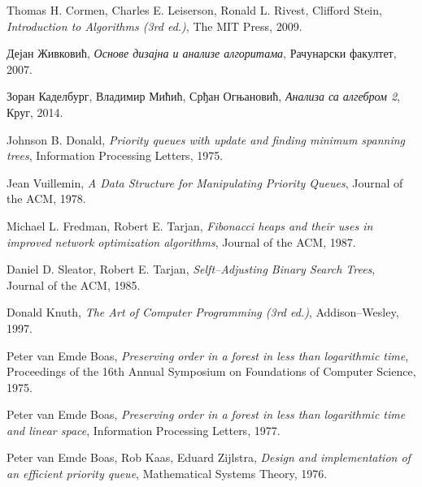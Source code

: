\documentclass[11pt, a4paper]{article}
\theoremstyle{remark}
\numberwithin{equation}{section}
\begin{document}
	\renewcommand\refname{Литература}
	\begin{thebibliography}{9}
		Thomas H. Cormen, Charles E. Leiserson, Ronald L. Rivest, Clifford Stein,
		\textit{Introduction to Algorithms (3rd ed.)},
		The MIT Press, 2009.
		
		Дејан Живковић,
		\textit{Основе дизајна и анализе алгоритама},
		Рачунарски факултет, 2007.
		
		Зоран Каделбург, Владимир Мићић, Срђан Огњановић,
		\textit{Анализа са алгебром 2},
		Круг, 2014.
		
		Johnson B. Donald,
		\textit{Priority queues with update and finding minimum spanning trees},
		Information Processing Letters, 1975.
		
		Jean Vuillemin,
		\textit{A Data Structure for Manipulating Priority Queues},
		Journal of the ACM, 1978.
		
		Michael L. Fredman, Robert E. Tarjan,
		\textit{Fibonacci heaps and their uses in improved network optimization algorithms},
		Journal of the ACM, 1987.
		
		Daniel D. Sleator, Robert E. Tarjan,
		\textit{Selft--Adjusting Binary Search Trees},
		Journal of the ACM, 1985.
		
		Donald Knuth,
		\textit{The Art of Computer Programming (3rd ed.)},
		Addison--Wesley, 1997.
		
		Peter van Emde Boas,
		\textit{Preserving order in a forest in less than logarithmic time},
		Proceedings of the 16th Annual Symposium on Foundations of Computer Science, 1975.
		
		Peter van Emde Boas,
		\textit{Preserving order in a forest in less than logarithmic time and linear space},
		Information Processing Letters, 1977.
		
		Peter van Emde Boas, Rob Kaas, Eduard Zijlstra,
		\textit{Design and implementation of an efficient priority queue},
		Mathematical Systems Theory, 1976.
	\end{thebibliography}
	
\end{document}
